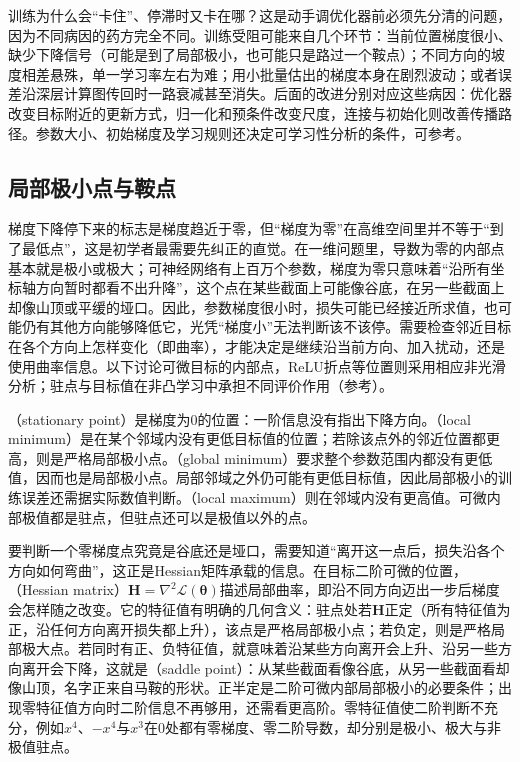 训练为什么会“卡住”、停滞时又卡在哪？这是动手调优化器前必须先分清的问题，因为不同病因的药方完全不同。训练受阻可能来自几个环节：当前位置梯度很小、缺少下降信号（可能是到了局部极小，也可能只是路过一个鞍点）；不同方向的坡度相差悬殊，单一学习率左右为难；用小批量估出的梯度本身在剧烈波动；或者误差沿深层计算图传回时一路衰减甚至消失。后面的改进分别对应这些病因：优化器改变目标附近的更新方式，归一化和预条件改变尺度，连接与初始化则改善传播路径。参数大小、初始梯度及学习规则还决定可学习性分析的条件，可参考。

\subsection{局部极小点与鞍点}
\label{sec:training-stationary-points}

梯度下降停下来的标志是梯度趋近于零，但“梯度为零”在高维空间里并不等于“到了最低点”，这是初学者最需要先纠正的直觉。在一维问题里，导数为零的内部点基本就是极小或极大；可神经网络有上百万个参数，梯度为零只意味着“沿所有坐标轴方向暂时都看不出升降”，这个点在某些截面上可能像谷底，在另一些截面上却像山顶或平缓的垭口。因此，参数梯度很小时，损失可能已经接近所求值，也可能仍有其他方向能够降低它，光凭“梯度小”无法判断该不该停。需要检查邻近目标在各个方向上怎样变化（即曲率），才能决定是继续沿当前方向、加入扰动，还是使用曲率信息。以下讨论可微目标的内部点，ReLU折点等位置则采用相应非光滑分析；驻点与目标值在非凸学习中承担不同评价作用（参考）。

（stationary point）是梯度为0的位置：一阶信息没有指出下降方向。（local minimum）是在某个邻域内没有更低目标值的位置；若除该点外的邻近位置都更高，则是严格局部极小点。（global minimum）要求整个参数范围内都没有更低值，因而也是局部极小点。局部邻域之外仍可能有更低目标值，因此局部极小的训练误差还需据实际数值判断。（local maximum）则在邻域内没有更高值。可微内部极值都是驻点，但驻点还可以是极值以外的点。

要判断一个零梯度点究竟是谷底还是垭口，需要知道“离开这一点后，损失沿各个方向如何弯曲”，这正是Hessian矩阵承载的信息。在目标二阶可微的位置，（Hessian matrix）$\bm H=\nabla^2\mathcal L(\bm\theta)$描述局部曲率，即沿不同方向迈出一步后梯度会怎样随之改变。它的特征值有明确的几何含义：驻点处若$\bm H$正定（所有特征值为正，沿任何方向离开损失都上升），该点是严格局部极小点；若负定，则是严格局部极大点。若同时有正、负特征值，就意味着沿某些方向离开会上升、沿另一些方向离开会下降，这就是（saddle point）：从某些截面看像谷底，从另一些截面看却像山顶，名字正来自马鞍的形状。正半定是二阶可微内部局部极小的必要条件；出现零特征值方向时二阶信息不再够用，还需看更高阶。零特征值使二阶判断不充分，例如$x^4$、$-x^4$与$x^3$在0处都有零梯度、零二阶导数，却分别是极小、极大与非极值驻点。

